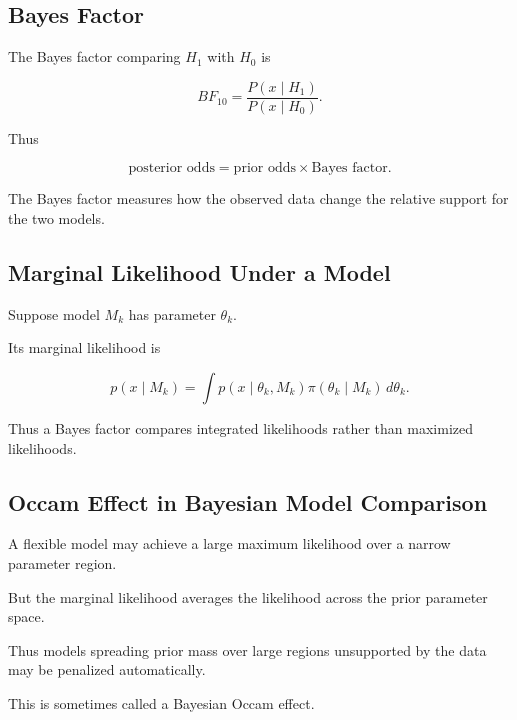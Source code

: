 \subsection{Bayes Factor}
\label{subsec:bayes-factor}

The Bayes factor comparing \(H_1\) with \(H_0\) is

\[
\boxed{
BF_{10}
=
\frac{
P(x\mid H_1)
}{
P(x\mid H_0)
}.
}
\]

Thus

\[
\boxed{
\text{posterior odds}
=
\text{prior odds}
\times
\text{Bayes factor}.
}
\]

The Bayes factor measures how the observed data change the relative
support for the two models.

\subsection{Marginal Likelihood Under a Model}
\label{subsec:model-marginal-likelihood}

Suppose model \(M_k\) has parameter \(\theta_k\).

Its marginal likelihood is

\[
\boxed{
p(x\mid M_k)
=
\int
p(x\mid\theta_k,M_k)
\pi(\theta_k\mid M_k)
\,d\theta_k.
}
\]

Thus a Bayes factor compares integrated likelihoods rather than maximized
likelihoods.

\subsection{Occam Effect in Bayesian Model Comparison}
\label{subsec:bayesian-occam-effect}

A flexible model may achieve a large maximum likelihood over a narrow
parameter region.

But the marginal likelihood averages the likelihood across the prior
parameter space.

Thus models spreading prior mass over large regions unsupported by the
data may be penalized automatically.

This is sometimes called a Bayesian Occam effect.


